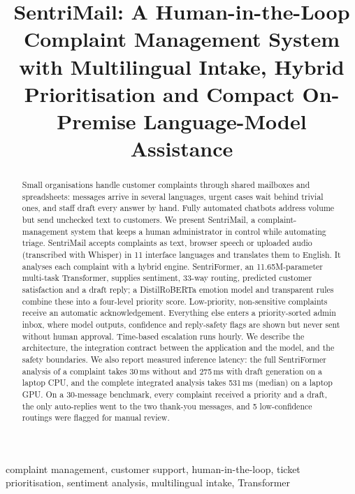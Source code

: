 \documentclass[conference]{IEEEtran}
\begin{document}
\title{SentriMail: A Human-in-the-Loop Complaint Management System with Multilingual Intake, Hybrid Prioritisation and Compact On-Premise Language-Model Assistance}

\author{
}

\maketitle

\begin{abstract}
Small organisations handle customer complaints through shared mailboxes and spreadsheets: messages arrive in several languages, urgent cases wait behind trivial ones, and staff draft every answer by hand. Fully automated chatbots address volume but send unchecked text to customers. We present SentriMail, a complaint-management system that keeps a human administrator in control while automating triage. SentriMail accepts complaints as text, browser speech or uploaded audio (transcribed with Whisper) in 11 interface languages and translates them to English. It analyses each complaint with a hybrid engine. SentriFormer, an 11.65M-parameter multi-task Transformer, supplies sentiment, 33-way routing, predicted customer satisfaction and a draft reply; a DistilRoBERTa emotion model and transparent rules combine these into a four-level priority score. Low-priority, non-sensitive complaints receive an automatic acknowledgement. Everything else enters a priority-sorted admin inbox, where model outputs, confidence and reply-safety flags are shown but never sent without human approval. Time-based escalation runs hourly. We describe the architecture, the integration contract between the application and the model, and the safety boundaries. We also report measured inference latency: the full SentriFormer analysis of a complaint takes 30\,ms without and 275\,ms with draft generation on a laptop CPU, and the complete integrated analysis takes 531\,ms (median) on a laptop GPU. On a 30-message benchmark, every complaint received a priority and a draft, the only auto-replies went to the two thank-you messages, and 5 low-confidence routings were flagged for manual review.
\end{abstract}

\begin{IEEEkeywords}
complaint management, customer support, human-in-the-loop, ticket prioritisation, sentiment analysis, multilingual intake, Transformer
\end{IEEEkeywords}
\end{document}

